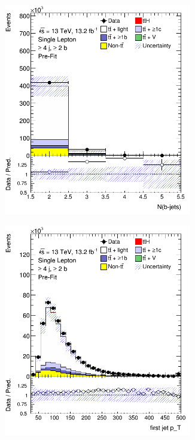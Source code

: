 \begin{figure}[p]
\begin{subfigure}{0.33\textwidth}
  \includegraphics[width=0.9\textwidth]{figures/ttH/presel/ljets_nBJets_ge4jge2b.png}
  \caption{}
  \label{}
\end{subfigure}
\begin{subfigure}{0.33\textwidth}
  \centering
  \includegraphics[width=0.9\textwidth]{figures/ttH/presel/ljets_jet1Pt_ge4jge2b.png}

\end{subfigure}
\end{figure}
